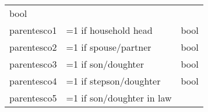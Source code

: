 \documentclass[11pt]{article}
\begin{document}
\begin{longtable}[]{@{}lll@{}}
\begin{minipage}[t]{0.24\columnwidth}
bool\strut
\end{minipage}\tabularnewline
\begin{minipage}[t]{0.19\columnwidth}\raggedright\strut
parentesco1\strut
\end{minipage} & \begin{minipage}[t]{0.16\columnwidth}\raggedright\strut
=1 if household head\strut
\end{minipage} & \begin{minipage}[t]{0.24\columnwidth}\raggedright\strut
bool\strut
\end{minipage}\tabularnewline
\begin{minipage}[t]{0.19\columnwidth}\raggedright\strut
parentesco2\strut
\end{minipage} & \begin{minipage}[t]{0.16\columnwidth}\raggedright\strut
=1 if spouse/partner\strut
\end{minipage} & \begin{minipage}[t]{0.24\columnwidth}\raggedright\strut
bool\strut
\end{minipage}\tabularnewline
\begin{minipage}[t]{0.19\columnwidth}\raggedright\strut
parentesco3\strut
\end{minipage} & \begin{minipage}[t]{0.16\columnwidth}\raggedright\strut
=1 if son/doughter\strut
\end{minipage} & \begin{minipage}[t]{0.24\columnwidth}\raggedright\strut
bool\strut
\end{minipage}\tabularnewline
\begin{minipage}[t]{0.19\columnwidth}\raggedright\strut
parentesco4\strut
\end{minipage} & \begin{minipage}[t]{0.16\columnwidth}\raggedright\strut
=1 if stepson/doughter\strut
\end{minipage} & \begin{minipage}[t]{0.24\columnwidth}\raggedright\strut
bool\strut
\end{minipage}\tabularnewline
\begin{minipage}[t]{0.19\columnwidth}\raggedright\strut
parentesco5\strut
\end{minipage} & \begin{minipage}[t]{0.16\columnwidth}\raggedright\strut
=1 if son/doughter in law\strut
\end{minipage} & \begin{minipage}[t]{0.24\columnwidth}\raggedright\strut

\end{minipage}
\end{longtable}
\end{document}
